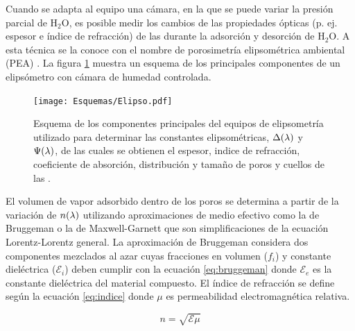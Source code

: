 		Cuando se adapta al equipo una cámara, en la que se puede variar la presión parcial de H$_2$O, es posible medir los cambios de las propiedades ópticas (p. ej. espesor e índice de refracción) de las \pdm\space durante la adsorción y desorción de H$_2$O. A esta técnica se la conoce con el nombre de porosimetría elipsométrica ambiental (PEA) \cite{Boissiere2005}. La figura \ref{fig:elipso} muestra un esquema de los principales componentes de un elipsómetro con cámara de humedad controlada.

			  \begin{figure}[h]
				\begin{center}
				\texttt{[image: Esquemas/Elipso.pdf]}
			  	\caption[Esquema de la técncia de elipsoporosimetría ambiental]{Esquema de los componentes principales del equipos de elipsometría utilizado para determinar las constantes elipsométricas, $\Delta(\lambda\index{longitud de onda})$ y $\Psi(\lambda\index{longitud de onda})$, de las cuales se obtienen el espesor, indice de refracción, coeficiente de absorción,  distribución y tamaño de poros y cuellos de las \pdm.}
			  	\label{fig:elipso}
			  	\end{center}
			  	\end{figure}
		
		El volumen de vapor adsorbido dentro de los poros se determina a partir de la variación de $n(\lambda\index{longitud de onda})$ utilizando aproximaciones de medio efectivo como la de Bruggeman\cite{Bruggeman1935} o la de Maxwell-Garnett\cite{Garnett1906} que son simplificaciones de la ecuación Lorentz-Lorentz  general\cite{TompkinsHarlandG.1999}.
		La aproximación de Bruggeman considera dos componentes mezclados al azar cuyas fracciones en volumen ($f_i$) y constante dieléctrica ($\mathcal{E}_i$) deben cumplir con la ecuación \ref{eq:bruggeman} donde $\mathcal{E}_e$ es la constante dieléctrica del material compuesto. El índice de refracción se define según la ecuación \ref{eq:indice} donde $\mu$ es permeabilidad electromagnética relativa.
		
						\begin{equation}
					 	   n=\sqrt{\mathcal{E}\mu}
					 	   \label{eq:indice}
						\end{equation}
		
